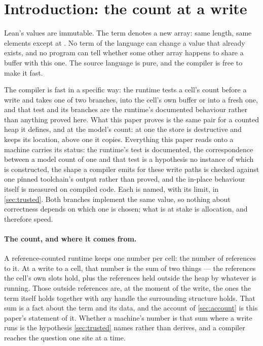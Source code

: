 \documentclass[11pt,a4paper]{article}
\theoremstyle{definition}
\theoremstyle{plain}
\newcommand{\code}[1]{\texttt{\detokenize{#1}}}
\begin{document}
\section{Introduction: the count at a write}
\label{sec:intro}

Lean's values are immutable. The term \code{a.set! i v} denotes a new array: same
length, same elements except at \code{i}. No term of the language can change a
value that already exists, and no program can tell whether some other array
happens to share a buffer with this one. The source language is pure, and the
compiler is free to make it fast.

The compiler is fast in a specific way: the runtime tests a cell's count before a
write and takes one of two branches, into the cell's own buffer or into a fresh
one, and that test and its branches are the runtime's documented behaviour rather
than anything proved here. What this paper proves is the same pair for a counted
heap it defines, and at the model's count: at one the store is destructive and
keeps its location, above one it copies. Everything this paper reads onto a
machine carries its status: the runtime's test is documented, the correspondence
between a model count of one and that test is a hypothesis no instance of which is
constructed, the shape a compiler emits for these write paths is checked against
one pinned toolchain's output rather than proved, and the in-place behaviour itself
is measured on compiled code. Each is named, with its limit, in \cref{sec:trusted}.
Both branches implement the same value, so nothing about correctness depends on
which one is chosen; what is at stake is allocation, and therefore speed.

\paragraph{The count, and where it comes from.} A reference-counted runtime keeps
one number per cell: the number of references to it. At a write to a cell, that
number is the sum of two things --- the references the cell's own slots hold, plus
the references held outside the heap by whatever is running. Those outside
references are, at the moment of the write, the ones the term itself holds
together with any handle the surrounding structure holds. That sum is a fact about
the term and its data, and the account of \cref{sec:account} is this paper's
statement of it. Whether a machine's number is that sum where a write runs is the
hypothesis \cref{sec:trusted} names rather than derives, and a compiler reaches the
question one site at a time.
\end{document}
